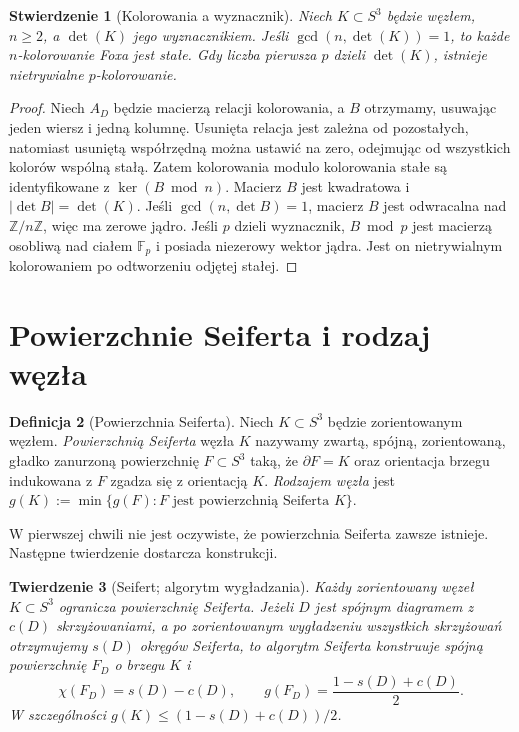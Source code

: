 \documentclass[11pt,a4paper]{report}
\numberwithin{equation}{section}
\theoremstyle{plain}
\newtheorem{twierdzenie}{Twierdzenie}[section]
\newtheorem{stwierdzenie}[twierdzenie]{Stwierdzenie}
\theoremstyle{definition}
\newtheorem{definicja}[twierdzenie]{Definicja}
\theoremstyle{remark}
\begin{document}
\begin{stwierdzenie}[Kolorowania a wyznacznik]
Niech $K\subset S^3$ będzie węzłem, $n\ge2$, a
$\det(K)$ jego wyznacznikiem. Jeśli
$\gcd(n,\det(K))=1$, to każde $n$-kolorowanie Foxa
jest stałe. Gdy liczba pierwsza $p$ dzieli $\det(K)$,
istnieje nietrywialne $p$-kolorowanie.
\end{stwierdzenie}

\begin{proof}
Niech $A_D$ będzie macierzą relacji kolorowania, a
$B$ otrzymamy, usuwając jeden wiersz i jedną kolumnę.
Usunięta relacja jest zależna od pozostałych, natomiast
usuniętą współrzędną można ustawić na zero, odejmując
od wszystkich kolorów wspólną stałą. Zatem kolorowania
modulo kolorowania stałe są identyfikowane z
$\ker(B\bmod n)$. Macierz $B$ jest kwadratowa i
$|\det B|=\det(K)$. Jeśli $\gcd(n,\det B)=1$,
macierz $B$ jest odwracalna nad $\mathbb Z/n\mathbb Z$,
więc ma zerowe jądro. Jeśli $p$ dzieli wyznacznik,
$B\bmod p$ jest macierzą osobliwą nad ciałem
$\mathbb F_p$ i posiada niezerowy wektor jądra.
Jest on nietrywialnym kolorowaniem po odtworzeniu
odjętej stałej.
\end{proof}

\section{Powierzchnie Seiferta i rodzaj węzła}
\label{sec:kt-seifert}

\begin{definicja}[Powierzchnia Seiferta]
Niech $K\subset S^3$ będzie zorientowanym węzłem.
\emph{Powierzchnią Seiferta} węzła $K$ nazywamy zwartą,
spójną, zorientowaną, gładko zanurzoną powierzchnię
$F\subset S^3$ taką, że $\partial F=K$ oraz orientacja
brzegu indukowana z $F$ zgadza się z orientacją $K$.
\emph{Rodzajem węzła} jest $g(K):=\min\{g(F):F\text{ jest
powierzchnią Seiferta }K\}$.
\end{definicja}

W pierwszej chwili nie jest oczywiste, że powierzchnia Seiferta
zawsze istnieje. Następne twierdzenie dostarcza konstrukcji.

\begin{twierdzenie}[Seifert; algorytm wygładzania]
Każdy zorientowany węzeł $K\subset S^3$ ogranicza powierzchnię
Seiferta. Jeżeli $D$ jest spójnym diagramem z $c(D)$ skrzyżowaniami,
a po zorientowanym wygładzeniu wszystkich skrzyżowań otrzymujemy
$s(D)$ okręgów Seiferta, to algorytm Seiferta konstruuje spójną
powierzchnię $F_D$ o brzegu $K$ i
\[
\chi(F_D)=s(D)-c(D),\qquad
 g(F_D)=\frac{1-s(D)+c(D)}{2}.
\]
W szczególności $g(K)\leq(1-s(D)+c(D))/2$.
\end{twierdzenie}
\end{document}
